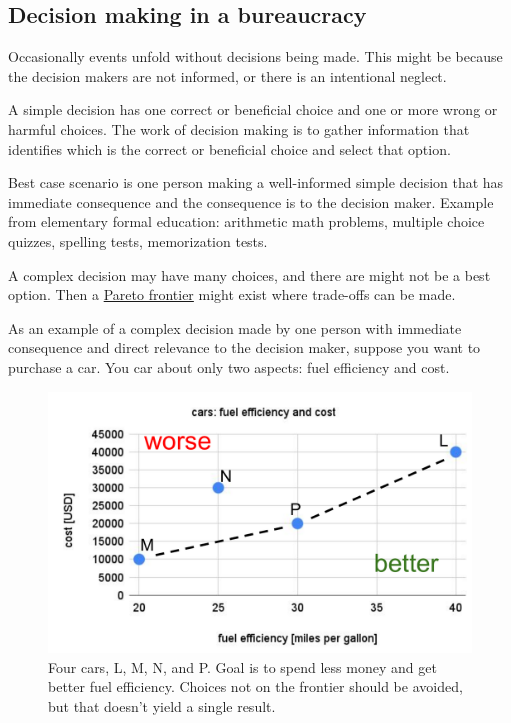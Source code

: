 \subsection{Decision making in a bureaucracy\label{sec:decision-making}}


Occasionally events unfold without decisions being made. This might be because the decision makers are not informed, or there is an intentional neglect.

A \gls{simple decision} has one correct or beneficial choice and one or more wrong or harmful choices. The work of decision making is to gather information that identifies which is the correct or beneficial choice and select that option.

Best case scenario is one person making a well-informed simple decision that has immediate consequence and the consequence is to the decision maker. Example from elementary formal education: arithmetic math problems, multiple choice quizzes, spelling tests, memorization tests. 

A complex decision may have many choices, and there are might not be a best option. Then a \href{https://en.wikipedia.org/wiki/Pareto_front}{Pareto frontier} might exist where trade-offs can be made. 

As an example of a complex decision made by one person with immediate consequence and direct relevance to the decision maker, suppose you want to purchase a car. You car about only two aspects: fuel efficiency and cost. 

\begin{figure}[ht]
    \centering
    \includegraphics[width=1\textwidth]{images/pareto_frontier_car_options.pdf}
    \caption{Four cars, L, M, N, and P. Goal is to spend less money and get better fuel efficiency. Choices not on the frontier should be avoided, but that doesn't yield a single result.}
    \label{fig:pareto_frontier_cars}
\end{figure}

